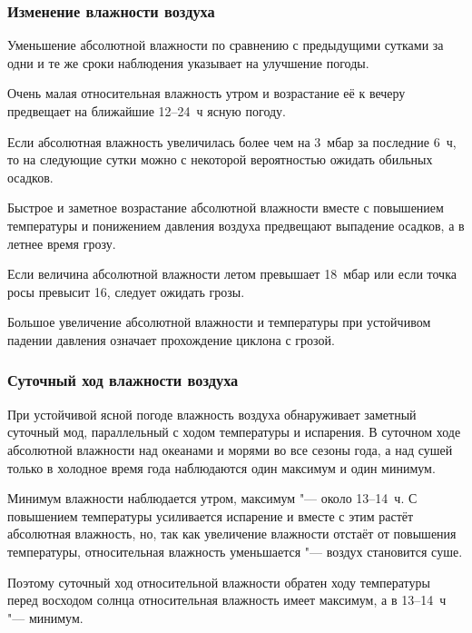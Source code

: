 \subsubsection{Изменение влажности воздуха}

 Уменьшение абсолютной влажности по сравнению с предыдущими
сутками за одни и те же сроки наблюдения указывает на улучшение
погоды.

 Очень малая относительная влажность утром и возрастание её к
вечеру предвещает на ближайшие 12--24~ч ясную погоду.

 Если абсолютная влажность увеличилась более чем на 3~мбар за
последние 6~ч, то на следующие сутки можно с некоторой вероятностью
ожидать обильных осадков.

 Быстрое и заметное возрастание абсолютной влажности вместе с
повышением температуры и понижением давления воздуха предвещают
выпадение осадков, а в летнее время грозу.

 Если величина абсолютной влажности летом превышает 18~мбар или
если точка росы превысит 16\grC, следует ожидать грозы.

 Большое увеличение абсолютной влажности и температуры при
устойчивом падении давления означает прохождение циклона с грозой.

\subsubsection{Суточный ход влажности воздуха}

При устойчивой ясной погоде влажность воздуха обнаруживает заметный
суточный мод, параллельный с ходом температуры и испарения. В суточном
ходе абсолютной влажности над океанами и морями во все сезоны года, а
над сушей только в холодное время года наблюдаются один максимум и
один минимум.

Минимум влажности наблюдается утром, максимум "--- около 13--14~ч. С
повышением температуры усиливается испарение и вместе с этим растёт
абсолютная влажность, но, так как увеличение влажности отстаёт от
повышения температуры, относительная влажность уменьшается "--- воздух
становится суше.

Поэтому суточный ход относительной влажности обратен ходу температуры
перед восходом солнца относительная влажность имеет максимум, а в
13--14~ч "--- минимум.

